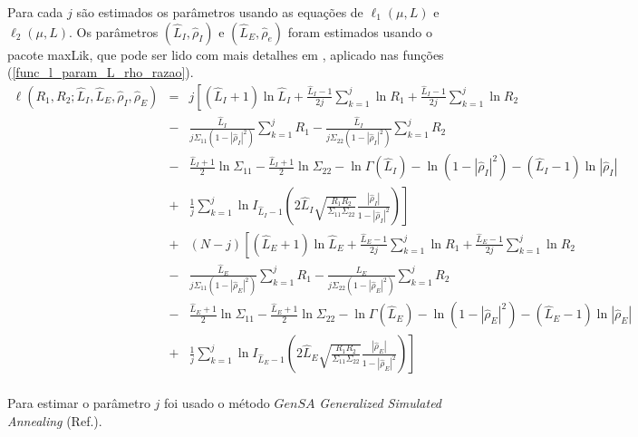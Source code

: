 \documentclass[remotesensing,article,submit,moreauthors,pdftex]{Definitions/mdpi}
\begin{document}
Para cada $j$ são estimados os parâmetros usando as equações de $\ell_1(\mu, L)$ e $\ell_2(\mu, L)$. Os parâmetros $(\hat{L}_I, \hat{\rho}_I)$ e $(\hat{L}_E, \hat{\rho}_e)$ foram estimados usando o pacote maxLik, que pode ser lido com mais detalhes em \cite{ht_2011}, aplicado nas funções (\ref{func_l_param_L_rho_razao}).
\begin{equation}\nonumber
\begin{array}{lll}
   \ell(R_1,R_2;\hat{L}_I,\hat{L}_E,\hat{\rho}_I,\hat{\rho}_E)&=&j\left[(\hat{L}_I+1)\ln \hat{L}_I +\frac{\hat{L}_I-1}{2j}\sum_{k=1}^{j}\ln R_1 +\frac{\hat{L}_I-1}{2j} \sum_{k=1}^{j}\ln R_2\right. \\
    &-&\frac{\hat{L}_I}{j\Sigma_{11}(1-|\hat{\rho}_I|^2)}\sum_{k=1}^{j}R_1-\frac{\hat{L}_I}{j\Sigma_{22}(1-|\hat{\rho}_I|^2)}\sum_{k=1}^{j}R_2\\
	&-&\frac{\hat{L}_I+1}{2}\ln\Sigma_{11}-\frac{\hat{L}_I+1}{2}\ln\Sigma_{22} - \ln\Gamma(\hat{L}_I)- \ln(1-|\hat{\rho}_I|^2)-(\hat{L}_I-1)\ln|\hat{\rho}_I|\\
	&+&\left.\frac{1}{j}\sum_{k=1}^{j}\ln I_{\hat{L}_I-1}\left(2\hat{L}_I\sqrt{\frac{R_1R_2}{\Sigma_{11}\Sigma_{22}}}\frac{|\hat{\rho}_I|}{1-|\hat{\rho}_I|^2}\right) \right]\\
              &+&(N-j)\left[(\hat{L}_E+1)\ln \hat{L}_E +\frac{\hat{L}_E-1}{2j}\sum_{k=1}^{j}\ln R_1 +\frac{\hat{L}_E-1}{2j} \sum_{k=1}^{j}\ln R_2\right. \\
    &-&\frac{\hat{L}_E}{j\Sigma_{11}(1-|\hat{\rho}_E|^2)}\sum_{k=1}^{j}R_1-\frac{\hat{L}_E}{j\Sigma_{22}(1-|\hat{\rho}_E|^2)}\sum_{k=1}^{j}R_2\\
	&-&\frac{\hat{L}_E+1}{2}\ln\Sigma_{11}-\frac{\hat{L}_E+1}{2}\ln\Sigma_{22} - \ln\Gamma(\hat{L}_E)- \ln(1-|\hat{\rho}_E|^2)-(\hat{L}_E-1)\ln|\hat{\rho}_E|\\
	&+&\left.\frac{1}{j}\sum_{k=1}^{j}\ln I_{\hat{L}_E-1}\left(2\hat{L}_E\sqrt{\frac{R_1R_2}{\Sigma_{11}\Sigma_{22}}}\frac{|\hat{\rho}_E|}{1-|\hat{\rho}_E|^2}\right) \right]\\ 
 \end{array}
 \end{equation}

Para estimar o  parâmetro $j$ foi usado o método $GenSA$ \textit{Generalized Simulated Annealing} (Ref.\cite{xgsh}).
\end{document}
